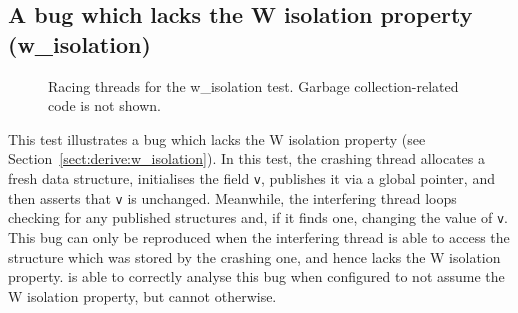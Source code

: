 
\subsection{A bug which lacks the W isolation property (w\_isolation)}

\begin{figure}
  \centerline{
    {\hfill}
    {\hfill}
    {\hfill}
  }
  \caption{Racing threads for the w\_isolation test.  Garbage
    collection-related code is not shown.}
  \label{fig:w_isolation}
\end{figure}

This test illustrates a bug which lacks the W isolation property (see
Section~\ref{sect:derive:w_isolation}).  In this test, the crashing
thread allocates a fresh data structure, initialises the field
\texttt{v}, publishes it via a global pointer, and then asserts that
\texttt{v} is unchanged.  Meanwhile, the interfering thread loops
checking for any published structures and, if it finds one, changing
the value of \texttt{v}.  This bug can only be reproduced when the
interfering thread is able to access the structure which was stored by
the crashing one, and hence lacks the W isolation property.
{\Implementation} is able to correctly analyse this bug when
configured to not assume the W isolation property, but cannot
otherwise.

